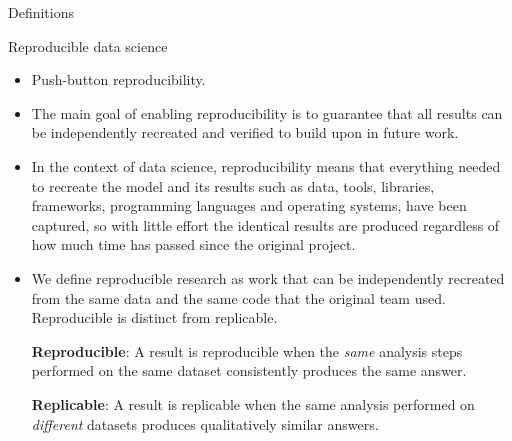 \documentclass[10pt,aspectratio=169,notes]{beamer} %
\begin{document}
\begin{frame}[label=frame3]{Definitions}
	\begin{alertblock}{Reproducible data science}
		\begin{itemize}
			\item Push-button reproducibility.
			\item The main goal of enabling reproducibility is to guarantee that all results can be independently recreated and verified to build upon in future work.
			\item In the context of data science, reproducibility means that everything needed to recreate the model and its results such as data, tools, libraries, frameworks, programming languages and operating systems, have been captured, so with little effort the identical results are produced regardless of how much time has passed since the original project.
			\item We define reproducible research as work that can be independently recreated from the same data and the same code that the original team used. 
			Reproducible is distinct from replicable.
			
			\textbf{Reproducible}: A result is reproducible when the \emph{same} analysis steps performed on the same dataset consistently produces the same answer.
			
			\textbf{Replicable}: A result is replicable when the same analysis performed on \emph{different} datasets produces qualitatively similar answers.
		\end{itemize}
	
	\end{alertblock}
\end{frame}
\end{document}
